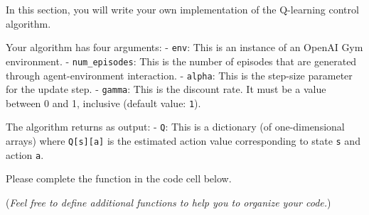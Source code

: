 \documentclass[11pt]{article}
\begin{document}
In this section, you will write your own implementation of the
Q-learning control algorithm.

Your algorithm has four arguments: - \texttt{env}: This is an instance
of an OpenAI Gym environment. - \texttt{num\_episodes}: This is the
number of episodes that are generated through agent-environment
interaction. - \texttt{alpha}: This is the step-size parameter for the
update step. - \texttt{gamma}: This is the discount rate. It must be a
value between 0 and 1, inclusive (default value: \texttt{1}).

The algorithm returns as output: - \texttt{Q}: This is a dictionary (of
one-dimensional arrays) where \texttt{Q{[}s{]}{[}a{]}} is the estimated
action value corresponding to state \texttt{s} and action \texttt{a}.

Please complete the function in the code cell below.

(\emph{Feel free to define additional functions to help you to organize
your code.})
\end{document}
